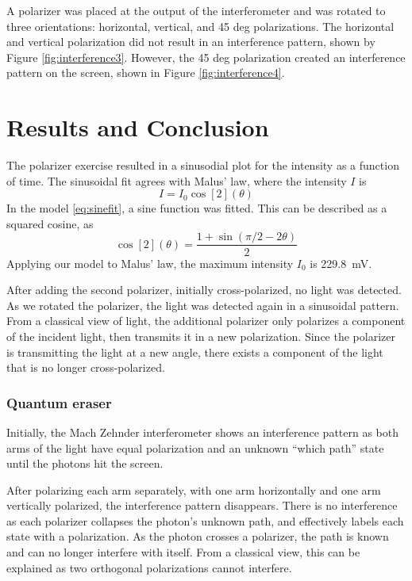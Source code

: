 \documentclass[notitlepage]{report}
\begin{document}
	A polarizer was placed at the output of the interferometer and was rotated to three orientations: horizontal, vertical, and 45 deg polarizations. The horizontal and vertical polarization did not result in an interference pattern, shown by Figure \ref{fig:interference3}. However, the 45 deg polarization created an interference pattern on the screen, shown in Figure \ref{fig:interference4}.
	


	
	\section{Results and Conclusion}
	The polarizer exercise resulted in a sinusodial plot for the intensity as a function of time. The sinusoidal fit agrees with Malus' law, where the intensity $I$ is \begin{equation}
		I = I_0 \cos[2](\theta)
	\end{equation}
	In the model \eqref{eq:sinefit}, a sine function was fitted. This can be described as a squared cosine, as \[ \cos[2](\theta) = \frac{1 + \sin(\pi / 2 - 2 \theta)}{2} \]
	Applying our model to Malus' law, the maximum intensity $I_0$ is \SI{229.8}{\mV}.
	
	After adding the second polarizer, initially cross-polarized, no light was detected. As we rotated the polarizer, the light was detected again in a sinusoidal pattern. From a classical view of light, the additional polarizer only polarizes a component of the incident light, then transmits it in a new polarization. Since the polarizer is transmitting the light at a new angle, there exists a component of the light that is no longer cross-polarized.
	
	\subsubsection{Quantum eraser}
	Initially, the Mach Zehnder interferometer shows an interference pattern as both arms of the light have equal polarization and an unknown ``which path'' state until the photons hit the screen.
	
	After polarizing each arm separately, with one arm horizontally and one arm vertically polarized, the interference pattern disappears. There is no interference as each polarizer collapses the photon's unknown path, and effectively labels each state with a polarization. As the photon crosses a polarizer, the path is known and can no longer interfere with itself. From a classical view, this can be explained as two orthogonal polarizations cannot interfere.
	
\end{document}
